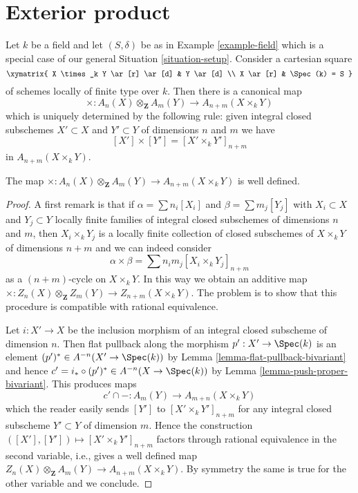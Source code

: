 \section{Exterior product}
\label{section-exterior-product}

\noindent
Let $k$ be a field and let $(S, \delta)$ be as in Example \ref{example-field}
which is a special case of our general Situation \ref{situation-setup}.
Consider a cartesian square
$$
\xymatrix{
X \times_k Y \ar[r] \ar[d] & Y \ar[d] \\
X \ar[r] & \Spec(k) = S
}
$$
of schemes locally of finite type over $k$. Then there is a canonical map
$$
\times :
A_n(X) \otimes_{\mathbf{Z}} A_m(Y)
\longrightarrow
A_{n + m}(X \times_k Y)
$$
which is uniquely determined by the following rule:
given integral closed subschemes $X' \subset X$
and $Y' \subset Y$ of dimensions $n$ and $m$ we have
$$
[X'] \times [Y'] = [X' \times_k Y']_{n + m}
$$
in $A_{n + m}(X \times_k Y)$.

\begin{lemma}
\label{lemma-exterior-product-well-defined}
The map
$\times : A_n(X) \otimes_{\mathbf{Z}} A_m(Y) \to A_{n + m}(X \times_k Y)$
is well defined.
\end{lemma}

\begin{proof}
A first remark is that if $\alpha = \sum n_i[X_i]$
and $\beta = \sum m_j[Y_j]$ with $X_i \subset X$ and $Y_j \subset Y$
locally finite families of integral closed subschemes of
dimensions $n$ and $m$, then
$X_i \times_k Y_j$ is a locally finite
collection of closed subschemes of $X \times_k Y$ of
dimensions $n + m$ and we can indeed consider
$$
\alpha \times \beta = \sum n_i m_j [X_i \times_k Y_j]_{n + m}
$$
as a $(n + m)$-cycle on $X \times_k Y$. In this way we obtain an
additive map
$\times : Z_n(X) \otimes_{\mathbf{Z}} Z_m(Y) \to Z_{n + m}(X \times_k Y)$.
The problem is to show that
this procedure is compatible with rational equivalence.

\medskip\noindent
Let $i : X' \to X$ be the inclusion morphism of
an integral closed subscheme of dimension $n$.
Then flat pullback along the morphism $p' : X' \to \Spec(k)$ is an element
$(p')^* \in A^{-n}(X' \to \Spec(k))$ by
Lemma \ref{lemma-flat-pullback-bivariant}
and hence $c' = i_* \circ (p')^* \in A^{-n}(X \to \Spec(k))$ by
Lemma \ref{lemma-push-proper-bivariant}.
This produces maps
$$
c' \cap - : A_m(Y) \longrightarrow A_{m + n}(X \times_k Y)
$$
which the reader easily sends $[Y']$ to $[X' \times_k Y']_{n + m}$
for any integral closed subscheme $Y' \subset Y$ of dimension
$m$. Hence the construction
$([X'], [Y']) \mapsto [X' \times_k Y']_{n + m}$
factors through rational equivalence in the second variable, i.e.,
gives a well defined map
$Z_n(X) \otimes_{\mathbf{Z}} A_m(Y) \to A_{n + m}(X \times_k Y)$.
By symmetry the same is true for the other variable and we conclude.
\end{proof}

